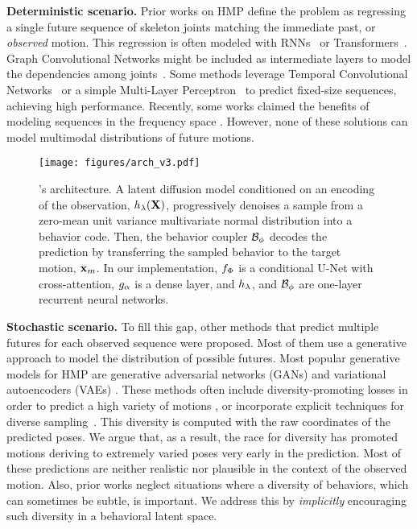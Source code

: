 \documentclass[10pt,twocolumn,letterpaper]{article}
\begin{document}
\textbf{Deterministic scenario.}
Prior works on HMP define the problem as regressing a single future sequence of skeleton joints matching the immediate past, or \textit{observed} motion. This regression is often modeled with RNNs~\cite{fragkiadaki2015recurrent, jain2016structural, martinez2017human, gui2018adversarial, pavllo2018quaternet, liu2019towards} or Transformers~\cite{aksan2021spatio, cai2020learning, martinez2021pose}. Graph Convolutional Networks might be included as intermediate layers to model the dependencies among joints~\cite{li2020dynamic, mao2019learning, dang2021msr, li2021skeleton}. Some methods leverage Temporal Convolutional Networks~\cite{li2018convolutional, medjaouri2022hr} or a simple Multi-Layer Perceptron~\cite{guo2022mlp} to predict fixed-size sequences, achieving high performance. Recently, some works claimed the benefits of modeling sequences in the frequency space \cite{cai2020learning, mao2019learning, mao2020history}. However, none of these solutions can model multimodal distributions of future motions. 


\begin{figure*}[t!]
    \centering
    \texttt{[image: figures/arch\_v3.pdf]}
\caption{\modelname{}'s architecture. A latent diffusion model conditioned on an encoding of the observation, $h_{\lambda}(\mathbf{X})$, progressively denoises a sample from a zero-mean unit variance multivariate normal distribution into a behavior code. Then, the behavior coupler $\mathcal{B}_{\phi}$ decodes the prediction by transferring the sampled behavior to the target motion, $\mathbf{x}_{m}$. In our implementation, $f_{\Phi}$ is a conditional U-Net with cross-attention, $g_{\alpha}$ is a dense layer, and $h_{\lambda}$, and $\mathcal{B}_{\phi}$ are one-layer recurrent neural networks.}
    \label{fig:main_arch}
    \vspace{-0.2cm}
\end{figure*}

\textbf{Stochastic scenario.} 
To fill this gap, other methods that predict multiple futures for each observed sequence were proposed. Most of them use a generative approach to model the distribution of possible futures. Most popular generative models for HMP are generative adversarial networks (GANs) \cite{barsoum2018hpgan, kundu2019bihmpgan} and variational autoencoders (VAEs) \cite{walker2017theposeknows, yan2018mtvae, cai2021unified, mao2021gsps}. 
These methods often include diversity-promoting losses in order to predict a high variety of motions \cite{mao2021gsps}, or incorporate explicit techniques for diverse sampling~\cite{yuan2020dlow, dang2022diverse,xu2022diverse}. This diversity is computed with the raw coordinates of the predicted poses. We argue that, as a result, the race for diversity has promoted motions deriving to extremely varied poses very early in the prediction. Most of these predictions are neither realistic nor plausible in the context of the observed motion. Also, prior works neglect situations where a diversity of behaviors, which can sometimes be subtle, is important. We address this by \textit{implicitly} encouraging such diversity in a behavioral latent space.
\end{document}
